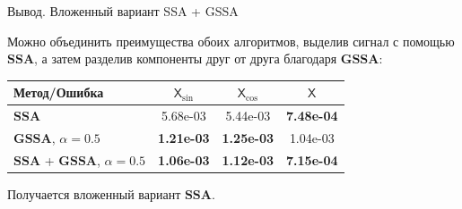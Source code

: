 \documentclass[notheorems, handout]{beamer}
\newcommand{\SSA}{\textbf{SSA}}
\newcommand{\GSSA}{\textbf{GSSA}}
\newcommand{\TS}{\mathsf{X}}
\begin{document}
	\begin{frame}{Вывод. Вложенный вариант SSA + GSSA}

		Можно объединить преимущества обоих алгоритмов, выделив сигнал с помощью $\SSA$, а затем разделив компоненты друг от друга благодаря $\GSSA$:
		\begin{table}[H]
			\label{tab:errs_ssa_gssa_united}
			\centering
			\begin{tabular}{l|ccc}
				\hline
				Метод/Ошибка & $\TS_{\sin}$ & $\TS_{\cos}$ & $\TS$ \\ 
				\hline
				$\SSA$      & 5.68e-03 & 5.44e-03 & \textbf{7.48e-04}  \\ 
				$\GSSA$, $\alpha = 0.5$ & \textbf{1.21e-03} & \textbf{1.25e-03} & 1.04e-03 \\
				\hline
				$\SSA$ + $\GSSA$, $\alpha = 0.5$ & \textbf{1.06e-03} & \textbf{1.12e-03} & \textbf{7.15e-04} \\ 
				\hline
			\end{tabular}
		\end{table}

		Получается вложенный вариант $\SSA$.

	\end{frame}
	
	
%		
%		
%		
%		
%		
%			
%		
%		
%	
	
\end{document}
